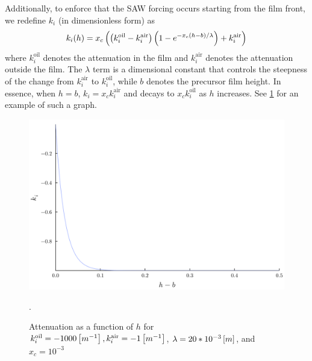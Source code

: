 Additionally, to enforce that the SAW forcing occurs starting from the film front, we redefine 
$k_i$ (in dimensionless form) as 
\begin{align}
    k_i\!\left( h \right) = x_c \left( \left( k_i^{\text{oil}} - k_i^{\text{air}} \right)\left( 1 - e^{-x_c(h-b)/\lambda} \right) + k_i^{\text{air}} \right)
    \label{eq:k_i}
\end{align}
where $k_i^{\text{oil}}$ denotes the attenuation in the film and $k_i^{\text{air}}$ denotes the attenuation
outside the film. The $\lambda$ term is a dimensional constant that controls the steepness of the change from $k_i^{\text{air}}$ to $k_i^{\text{oil}}$, 
while $b$ denotes the precursor film height. In essence, when $h = b$, $k_i = x_c k_i^{\text{air}}$ and  
decays to $x_c k_i^{\text{oil}}$ as $h$ increases. See \cref{fig:attenuation} for an example of such a graph. 

\begin{figure}[ht]
    \centering
    \includegraphics[scale=0.25]{images/report/attenuation.png}
    \caption{Attenuation as a function of $h$ for $k_i^{\text{oil}} = -1000 \left[ m^{-1} \right], k_i^{\text{air}} = -1 \left[ m^{-1} \right]$, 
    $\lambda = 20*10^{-3} \left[ m \right]$, and $x_c = 10^{-3}$}. 
    \label{fig:attenuation}
\end{figure}